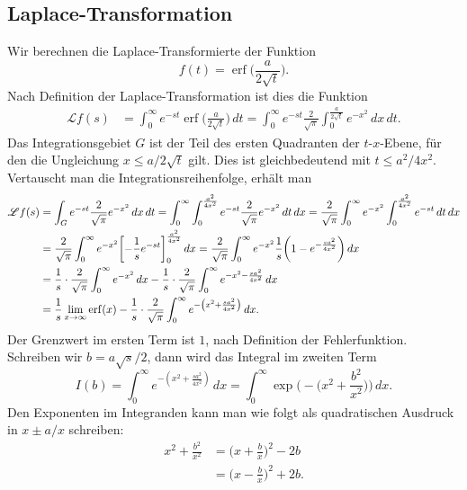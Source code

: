 %
%
\subsection{Laplace-Transformation}
Wir berechnen die Laplace-Transformierte der Funktion
\[
f(t) = \operatorname{erf}\biggl(\frac{a}{2\sqrt{t}}\biggr).
\]
Nach Definition der Laplace-Transformation ist dies die Funktion
\begin{align*}
\mathscr{L}f(s)
&=
\int_0^\infty
e^{-st} \operatorname{erf}\biggl(\frac{a}{2\sqrt{t}}\biggr)
\,dt
=
\int_0^\infty
e^{-st}
\frac{2}{\sqrt{\pi}}
\int_0^{\frac{a}{2\sqrt{t}}}
e^{-x^2}
\,dx
\,dt.
\end{align*}
Das Integrationsgebiet $G$ ist der Teil des ersten Quadranten der
$t$-$x$-Ebene, für den die Ungleichung $x \le a/2\sqrt{t}$ gilt.
Dies ist gleichbedeutend mit $t \le a^2/4x^2$.
Vertauscht man die Integrationsreihenfolge, erhält man
\begin{align}
\mathscr{L}f(s)
&=
\int_G
e^{-st}
\frac{2}{\sqrt{\pi}}
e^{-x^2}
\,dx \,dt
=
\int_0^\infty
\int_0^{\frac{a^2}{4x^2}}
e^{-st}
\frac{2}{\sqrt{\pi}}
e^{-x^2}
\,dt
\,dx
=
\frac{2}{\sqrt{\pi}}
\int_0^\infty
e^{-x^2}
\int_0^{\frac{a^2}{4x^2}}
e^{-st}
\,dt
\,dx
\notag
\\
&=
\frac{2}{\sqrt{\pi}}
\int_0^\infty
e^{-x^2}
\biggl[
-\frac1{s}e^{-st}
\biggr]_0^{\frac{a^2}{4x^2}}
\,dx
=
\frac{2}{\sqrt{\pi}}
\int_0^\infty
e^{-x^2}
\frac1{s}
\biggl(
1-e^{-\frac{sa^2}{4x^2}}
\biggr)
\,dx
\notag
\\
&=
\frac{1}{s}
\cdot
\frac{2}{\sqrt{\pi}}\int_0^\infty e^{-x^2}\,dx
-
\frac1{s}
\cdot
\frac{2}{\sqrt{\pi}}
\int_0^\infty
e^{-x^2-\frac{sa^2}{4x^2}}
\,dx
\notag
\\
&=
\frac1s\lim_{x\to\infty} \operatorname{erf}(x)
-
\frac1s
\cdot
\frac{2}{\sqrt{\pi}}
\int_0^\infty e^{-\left(x^2+\frac{sa^2}{4x^2}\right)}\,dx.
\label{buch:integrale:eqn:laplaceerf}
\end{align}
Der Grenzwert im ersten Term ist $1$, nach Definition der Fehlerfunktion. 
Schreiben wir $b=a\sqrt{s}/2$, dann wird das Integral im zweiten Term
\begin{equation}
I(b)
=
\int_0^\infty e^{-\left(x^2+\frac{sa^2}{4x^2}\right)}\,dx
=
\int_0^\infty \exp\biggl(-\biggl(x^2+\frac{b^2}{x^2}\biggr)\biggr)\,dx.
\label{buch:integrale:eqn:Ibsumme}
\end{equation}
Den Exponenten im Integranden kann man wie folgt als quadratischen
Ausdruck in $x\pm a/x$ schreiben:
\begin{equation*}
\begin{aligned}
x^2 + \frac{b^2}{x^2}
&=
\biggl(x+\frac{b}{x}\biggr)^2 - 2b
\\
&=
\biggl(x-\frac{b}{x}\biggr)^2 + 2b.
\end{aligned}
\end{equation*}
